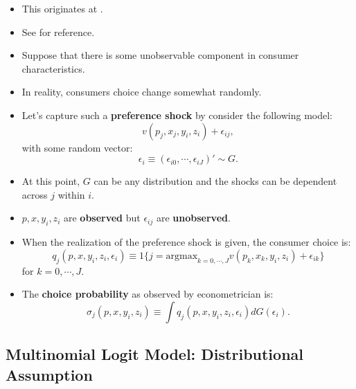 \documentclass[
]{book}
\providecommand{\tightlist}{%
  \setlength{\itemsep}{0pt}\setlength{\parskip}{0pt}}
\begin{document}
\begin{itemize}
\tightlist
\item
  This originates at \citet{Mcfadden1974}.
\item
  See \citet{Train2009} for reference.
\item
  Suppose that there is some unobservable component in consumer characteristics.
\item
  In reality, consumers choice change somewhat randomly.
\item
  Let's capture such a \textbf{preference shock} by consider the following model:
  \begin{equation}
  v(p_j, x_j, y_i, z_i) + \epsilon_{ij},
  \end{equation}
  with some random vector:
  \begin{equation}
  \epsilon_i \equiv (\epsilon_{i0}, \cdots, \epsilon_{iJ})' \sim G.
  \end{equation}
\item
  At this point, \(G\) can be any distribution and the shocks can be dependent across \(j\) within \(i\).
\item
  \(p, x, y_i, z_i\) are \textbf{observed} but \(\epsilon_{ij}\) are \textbf{unobserved}.
\item
  When the realization of the preference shock is given, the consumer choice is:
  \[
  q_j(p, x, y_i, z_i, \epsilon_{i}) \equiv 1\{j = \text{argmax}_{k = 0, \cdots, J} v(p_k, x_k, y_i, z_i) + \epsilon_{ik}\}
  \]
  for \(k = 0, \cdots, J\).
\item
  The \textbf{choice probability} as observed by econometrician is:
  \[
  \sigma_j(p, x, y_i, z_i) \equiv \int q_j(p, x, y_i, z_i, \epsilon_{i}) dG(\epsilon_i).
  \]
\end{itemize}

\hypertarget{multinomial-logit-model-distributional-assumption}{%
\subsection{Multinomial Logit Model: Distributional Assumption}\label{multinomial-logit-model-distributional-assumption}}
\end{document}
